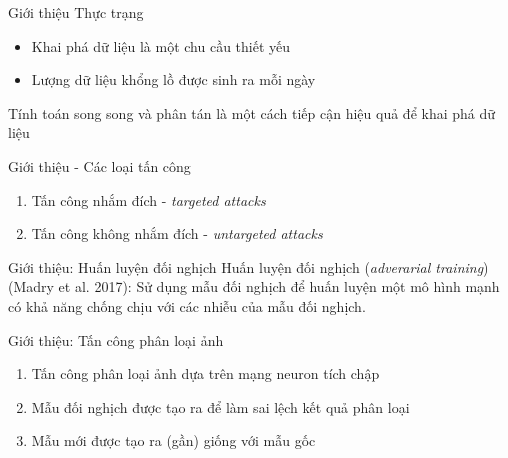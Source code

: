 \begin{frame}{Giới thiệu}
    Thực trạng
    \begin{itemize}
        \item Khai phá dữ liệu là một chu cầu thiết yếu
        \item Lượng dữ liệu khổng lồ được sinh ra mỗi ngày
    \end{itemize}
    Tính toán song song và phân tán là một cách tiếp cận hiệu quả để khai phá dữ liệu
\end{frame}

\begin{frame}{Giới thiệu - Các loại tấn công}
    \begin{enumerate}
        \item Tấn công nhắm đích - \textit{targeted attacks}
        \item Tấn công không nhắm đích - \textit{untargeted attacks}
    \end{enumerate}
\end{frame}

\begin{frame}{Giới thiệu: Huấn luyện đối nghịch}
    Huấn luyện đối nghịch (\textit{adverarial training}) (Madry et al. 2017): Sử dụng mẫu đối nghịch để huấn luyện một mô hình mạnh có khả năng chống chịu với các nhiễu của mẫu đối nghịch.
\end{frame}

\begin{frame}{Giới thiệu: Tấn công phân loại ảnh}
    \begin{enumerate}
        \item Tấn công phân loại ảnh dựa trên mạng neuron tích chập
        \item Mẫu đối nghịch được tạo ra để làm sai lệch kết quả phân loại
        \item Mẫu mới được tạo ra (gần) giống với mẫu gốc
    \end{enumerate}
\end{frame}

